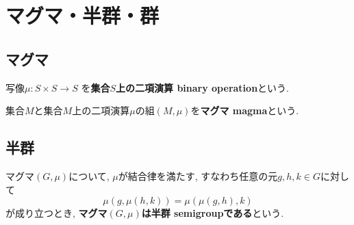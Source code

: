 \section{マグマ・半群・群}
\subsection{マグマ}
\begin{Def}
写像$\mu:S\times S\rightarrow S$
を{\bf 集合$S$上の二項演算 binary operation}という.
\end{Def}
\begin{Def}
集合$M$と集合$M$上の二項演算$\mu$の組$(M,\mu)$を{\bf マグマ magma}という.
\end{Def}
\subsection{半群}
\begin{Def}
マグマ$(G,\mu)$について,
$\mu$が結合律を満たす, すなわち任意の元$g,h,k\in G$に対して\[\mu(g,\mu(h,k))=\mu(\mu(g,h),k)\]
が成り立つとき, {\bf マグマ$(G,\mu)$は半群 semigroupである}という.
\end{Def}
